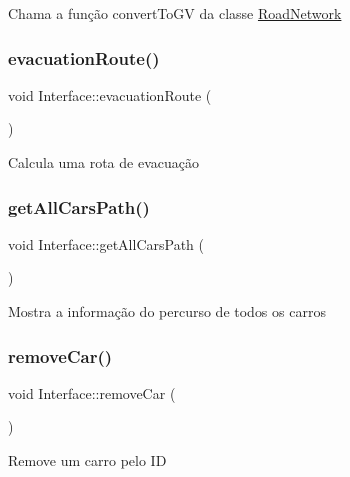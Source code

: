 Chama a função convert\+To\+GV da classe \mbox{\hyperlink{class_road_network}{Road\+Network}} \mbox{\label{class_interface_ab465fb7313b88d389af87d713b27d2ba}} 
\subsubsection{\texorpdfstring{evacuation\+Route()}{evacuationRoute()}}
{\footnotesize\ttfamily void Interface\+::evacuation\+Route (\begin{DoxyParamCaption}{ }\end{DoxyParamCaption})}

Calcula uma rota de evacuação \mbox{\label{class_interface_a3e043e9aa51fa1e16436d1a3247a9daa}} 
\subsubsection{\texorpdfstring{get\+All\+Cars\+Path()}{getAllCarsPath()}}
{\footnotesize\ttfamily void Interface\+::get\+All\+Cars\+Path (\begin{DoxyParamCaption}{ }\end{DoxyParamCaption})}

Mostra a informação do percurso de todos os carros \mbox{\label{class_interface_a2bbf8267df70e1aa4a225ab4ca17ff66}} 
\subsubsection{\texorpdfstring{remove\+Car()}{removeCar()}}
{\footnotesize\ttfamily void Interface\+::remove\+Car (\begin{DoxyParamCaption}{ }\end{DoxyParamCaption})}

Remove um carro pelo ID \mbox{\label{class_interface_ac9d3a7f7dd91e5684e988942d1e62c6f}} 
